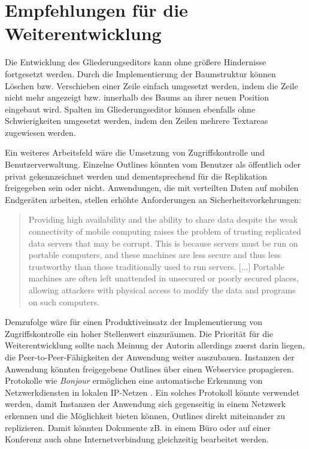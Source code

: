   

\section{Empfehlungen für die Weiterentwicklung}

Die Entwicklung des Gliederungseditors kann ohne größere Hindernisse fortgesetzt werden. Durch die Implementierung der Baumstruktur können Löschen bzw. Verschieben einer Zeile einfach umgesetzt werden, indem die Zeile nicht mehr angezeigt bzw. innerhalb des Baums an ihrer neuen Position eingebaut wird. Spalten im Gliederungseditor können ebenfalls ohne Schwierigkeiten umgesetzt werden, indem den Zeilen mehrere Textareas zugewiesen werden. 

Ein weiteres Arbeitsfeld wäre die Umsetzung von Zugriffskontrolle und Benutzerverwaltung. Einzelne Outlines könnten vom Benutzer als öffentlich oder privat gekennzeichnet werden und dementsprechend für die Replikation freigegeben sein oder nicht. Anwendungen, die mit verteilten Daten auf mobilen Endgeräten arbeiten, stellen erhöhte Anforderungen an Sicherheitsvorkehrungen:   

\begin{quote}
Providing high availability and the ability to share data despite the weak connectivity of mobile computing raises the problem of trusting replicated data servers that may be corrupt. This is because servers must be run on portable computers, and these machines are less secure and thus less trustworthy than those traditionally used to run servers. [...] Portable machines are often left unattended in unsecured or poorly secured places, allowing attackers with physical access to modify the data and programs on such computers. 
\end{quote}


Demzufolge wäre für einen Produktiveinsatz der Implementierung von Zugriffskontrolle ein hoher Stellenwert einzuräumen. Die Priorität für die Weiterentwicklung sollte nach Meinung der Autorin allerdings zuerst darin liegen, die Peer-to-Peer-Fähigkeiten der Anwendung weiter auszubauen. Instanzen der Anwendung könnten freigegebene Outlines über einen Webservice propagieren. Protokolle wie \textit{Bonjour} ermöglichen eine automatische Erkennung von Netzwerkdiensten in lokalen IP-Netzen \cite{bonjour:website}. Ein solches Protokoll könnte verwendet werden, damit Instanzen der Anwendung sich gegenseitig in einem Netzwerk erkennen und die Möglichkeit bieten können, Outlines direkt miteinander zu replizieren. Damit könnten Dokumente zB. in einem Büro oder auf einer Konferenz auch ohne Internetverbindung gleichzeitig bearbeitet werden.
  
